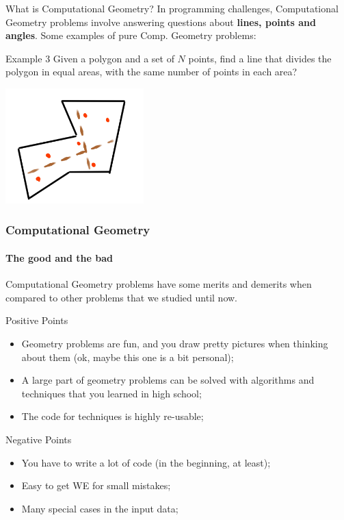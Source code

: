 \begin{frame}[t]{What is Computational Geometry?}
  In programming challenges, Computational Geometry problems involve answering questions about {\bf lines, points and angles}. Some examples of pure Comp. Geometry problems:

  \begin{block}{Example 3}
    Given a polygon and a set of $N$ points, find a line that divides the polygon in equal areas, with the same number of points in each area?
  \end{block}

  \begin{center}
    \includegraphics[width=0.4\textwidth]{img/sampleproblem_3.png}
  \end{center}
\end{frame}


\begin{frame}
  \frametitle{Computational Geometry}
  \framesubtitle{The good and the bad}

  Computational Geometry problems have some merits and demerits when compared to other problems that we studied until now.

  \begin{block}{Positive Points}
    \begin{itemize}
      \item Geometry problems are fun, and you draw pretty pictures when thinking about them (ok, maybe this one is a bit personal);
      \item A large part of geometry problems can be solved with algorithms and techniques that you learned in high school;
      \item The code for techniques is highly re-usable;
    \end{itemize}
  \end{block}

  \begin{alertblock}{Negative Points}
    \begin{itemize}
      \item You have to write a lot of code (in the beginning, at least);
      \item Easy to get WE for small mistakes;
      \item Many special cases in the input data;
    \end{itemize}
  \end{alertblock}
\end{frame}


